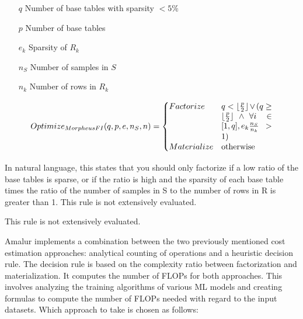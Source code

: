 \begin{definition}
    \begin{itemize}
        \item[]
            \item[$q$]Number of base tables with sparsity $ < 5\% $
        \item[$p$] Number of base tables
        \item[$e_k$] Sparsity of $R_k$
        \item[$n_S$] Number of samples in $S$
        \item[$n_k$] Number of rows in $R_k$
    \end{itemize}

    \begin{align*}
        \begin{split}
            Optimize_{MorpheusFI}(q, p, e, n_S, n) =
            \begin{cases}
                Factorize   & \parbox[t]{.18\linewidth}{$q < \lfloor \frac{p}{2} \rfloor \vee ( q \geq \lfloor \frac{p}{2} \rfloor \wedge \forall i \in [1,q], e_k \frac{n_S}{n_k} > 1)$} \\
                Materialize & \text{otherwise}
            \end{cases}
        \end{split}
    \end{align*}
\end{definition}

In natural language, this states that you should only factorize if a low ratio of the base tables is sparse, or if the ratio is high and the sparsity of each base table times the ratio of the number of samples in S to the number of rows in R is greater than 1. This rule is not extensively evaluated.

This rule is not extensively evaluated. 

Amalur \cite{schijndel_cost_estimation} implements a combination between the two previously mentioned cost estimation approaches: analytical counting of operations and a heuristic decision rule. The decision rule is based on the complexity ratio between factorization and materialization. It computes the number of FLOPs for both approaches. This involves analyzing the training algorithms of various ML models and creating formulas to compute the number of FLOPs needed with regard to the input datasets. Which approach to take is chosen as follows:

